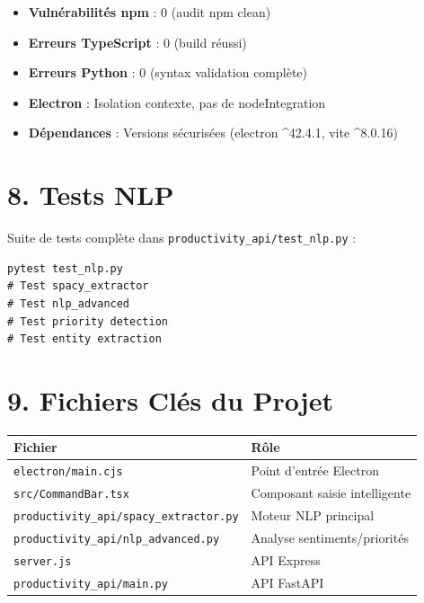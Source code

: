 \documentclass[12pt,french]{article}
\begin{document}
\begin{itemize}
    \item \textbf{Vulnérabilités npm} : 0 (audit npm clean)
    \item \textbf{Erreurs TypeScript} : 0 (build réussi)
    \item \textbf{Erreurs Python} : 0 (syntax validation complète)
    \item \textbf{Electron} : Isolation contexte, pas de nodeIntegration
    \item \textbf{Dépendances} : Versions sécurisées (electron ^42.4.1, vite ^8.0.16)
\end{itemize}

\vspace{0.5cm}

\section*{8. Tests NLP}

Suite de tests complète dans \texttt{productivity\_api/test\_nlp.py} :
\begin{lstlisting}
pytest test_nlp.py
# Test spacy_extractor
# Test nlp_advanced
# Test priority detection
# Test entity extraction
\end{lstlisting}

\vspace{0.5cm}

\section*{9. Fichiers Clés du Projet}

\begin{table}[h!]
\centering
\begin{tabular}{ll}
\toprule
\textbf{Fichier} & \textbf{Rôle} \\
\midrule
\texttt{electron/main.cjs} & Point d'entrée Electron \\
\texttt{src/CommandBar.tsx} & Composant saisie intelligente \\
\texttt{productivity\_api/spacy\_extractor.py} & Moteur NLP principal \\
\texttt{productivity\_api/nlp\_advanced.py} & Analyse sentiments/priorités \\
\texttt{server.js} & API Express \\
\texttt{productivity\_api/main.py} & API FastAPI \\
\bottomrule
\end{tabular}
\end{table}
\end{document}
